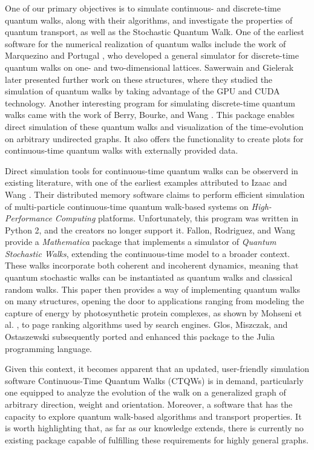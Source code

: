 \documentclass[main.tex]{subfiles}
\begin{document}
One of our primary objectives is to simulate continuous- and discrete-time
quantum walks, along with their algorithms, and investigate the properties of
quantum transport, as well as the Stochastic Quantum Walk. One of the earliest
software for the numerical realization of quantum walks include the work of
Marquezino and Portugal \cite{marquezino2008}, who developed a general
simulator for discrete-time quantum walks on one- and two-dimensional lattices.
Sawerwain and Gielerak \cite{sawerwain2010} later presented further work on
these structures, where they studied the simulation of quantum walks by taking
advantage of the GPU and CUDA technology. Another interesting program for
simulating discrete-time quantum walks came with the work of Berry, Bourke, and
Wang \cite{berry2011}. This package enables direct simulation of these quantum
walks and visualization of the time-evolution on arbitrary undirected graphs.
It also offers the functionality to create plots for continuous-time quantum
walks with externally provided data.\par 

Direct simulation tools for continuous-time quantum walks can be observerd in
existing literature, with one of the earliest examples attributed to Izaac and
Wang \cite{izaac2015}. Their distributed memory software claims to perform
efficient simulation of multi-particle continuous-time quantum walk-based
systems on \textit{High-Performance Computing} platforms. Unfortunately, this
program was written in Python 2, and the creators no longer support it.
Fallon, Rodriguez, and Wang \cite{falloon2017a} provide a \textit{Mathematica}
package that implements a simulator of \textit{Quantum Stochastic Walks},
extending the continuous-time model to a broader context. These walks
incorporate both coherent and incoherent dynamics, meaning that quantum
stochastic walks can be instantiated as quantum walks and classical random
walks. This paper then provides a way of implementing quantum walks on many
structures, opening the door to applications ranging from modeling the capture
of energy by photosynthetic protein complexes, as shown by Mohseni et al.
\cite{mohseni08}, to page ranking algorithms used by search engines. Glos,
Miszczak, and Ostaszewski \cite{glos2018} subsequently ported and enhanced this
package to the Julia programming language. \par

Given this context, it becomes apparent that an updated, user-friendly
simulation software Continuous-Time Quantum Walks (CTQWs) is in demand,
particularly one equipped to analyze the evolution of the walk on a generalized
graph of arbitrary direction, weight and orientation. Moreover, a software that
has the capacity to explore quantum walk-based algorithms and transport
properties. It is worth highlighting that, as far as our knowledge extends,
there is currently no existing package capable of fulfilling these requirements
for highly general graphs. \par
\end{document}
